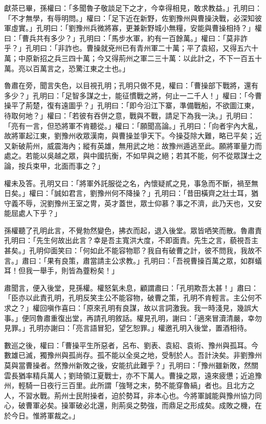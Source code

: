 獻茶已畢，孫權曰：「多聞魯子敬談足下之才，今幸得相見，敢求教益。」孔明曰：「不才無學，有辱明問。」權曰：「足下近在新野，佐劉豫州與曹操決戰，必深知彼軍虛實。」孔明曰：「劉豫州兵微將寡，更兼新野城小無糧，安能與曹操相持？」權曰：「曹兵共有多少？」孔明曰：「馬步水軍，約有一百餘萬。」權曰：「莫非詐乎？」孔明曰：「非詐也。曹操就兗州已有青州軍二十萬；平了袁紹，又得五六十萬；中原新招之兵三四十萬；今又得荊州之軍二三十萬：以此計之，不下一百五十萬。亮以百萬言之，恐驚江東之士也。」

魯肅在旁，聞言失色，以目視孔明；孔明只做不見，權曰：「曹操部下戰將，還有多少？」孔明曰：「足智多謀之士，能征慣戰之將，何止一二千人！」權曰：「今曹操平了荊楚，復有遠圖乎？」孔明曰：「即今沿江下寨，準備戰船，不欲圖江東，待取何地？」權曰：「若彼有吞併之意，戰與不戰，請足下為我一決。」孔明曰：「亮有一言，但恐將軍不肯聽從。」權曰：「願聞高論。」孔明曰：「向者宇內大亂，故將軍起江東，劉豫州收眾漢南，與曹操並爭天下。今操芟除大難，略已平矣；近又新破荊州，威震海內；縱有英雄，無用武之地：故豫州遁逃至此。願將軍量力而處之。若能以吳越之眾，與中國抗衡，不如早與之絕；若其不能，何不從眾謀士之論，按兵束甲，北面而事之？」

權未及答。孔明又曰：「將軍外託服從之名，內懷疑貳之見，事急而不斷，禍至無日矣。」權曰：「誠如君言，劉豫州何不降操？」孔明曰：「昔田橫齊之壯士耳，猶守義不辱，況劉豫州王室之冑，英才蓋世，眾士仰慕？事之不濟，此乃天也，又安能屈處人下乎？」

孫權聽了孔明此言，不覺勃然變色，拂衣而起，退入後堂。眾皆哂笑而散。魯肅責孔明曰：「先生何故出此言？幸是吾主寬洪大度，不即面責。先生之言，藐視吾主甚矣。」孔明仰面笑曰：「何如此不能容物耶？我自有破曹之計，彼不問我，我故不言。」肅曰：「果有良策，肅當請主公求教。」孔明曰：「吾視曹操百萬之眾，如群蟻耳！但我一舉手，則皆為虀粉矣！」

肅聞言，便入後堂，見孫權。權怒氣未息，顧謂肅曰：「孔明欺吾太甚！」肅曰：「臣亦以此責孔明，孔明反笑主公不能容物，破曹之策，孔明不肯輕言。主公何不求之？」權回嗔作喜曰：「原來孔明有良謀，故以言詞激我。我一時淺見，幾誤大事。」便同魯肅重復出堂，再請孔明敘話。權見孔明，謝曰：「適來冒瀆清嚴，幸勿見罪。」孔明亦謝曰：「亮言語冒犯，望乞恕罪。」權邀孔明入後堂，置酒相待。

數巡之後，權曰：「曹操平生所惡者，呂布、劉表、袁紹、袁術、豫州與孤耳。今數雄已滅，獨豫州與孤尚存。孤不能以全吳之地，受制於人。吾計決矣。非劉豫州莫與當曹操者。然豫州新敗之後，安能抗此難乎？」孔明曰：「豫州雖新敗，然關雲長猶率精兵萬人；劉琦領江夏戰士，亦不下萬人。曹操之眾，遠來疲憊；近追豫州，輕騎一日夜行三百里。此所謂「強弩之末，勢不能穿魯縞」者也。且北方之人，不習水戰。荊州士民附操者，迫於勢耳，非本心也。今將軍誠能與豫州協力同心，破曹軍必矣。操軍破必北還，則荊吳之勢強，而鼎足之形成矣。成敗之機，在於今日。惟將軍裁之。」

